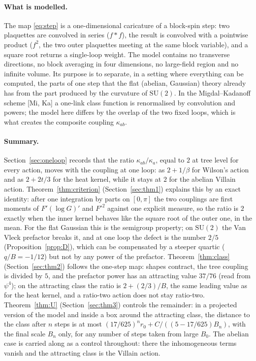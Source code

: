 \documentclass[11pt,a4paper]{article}
\theoremstyle{definition}
\theoremstyle{remark}
\newcommand{\SU}{\mathrm{SU}(2)}
\begin{document}
\paragraph{What is modelled.}
The map \eqref{eq:step} is a one-dimensional caricature of a block-spin step: two plaquettes are convolved in series ($f*f$), the result is convolved with a pointwise product ($f^2$, the two outer plaquettes meeting at the same block variable), and a square root returns a single-loop weight.
The model contains no transverse directions, no block averaging in four dimensions, no large-field region and no infinite volume.
Its purpose is to separate, in a setting where everything can be computed, the parts of one step that the flat (abelian, Gaussian) theory already has from the part produced by the curvature of $\SU$.
In the Migdal--Kadanoff scheme [Mi, Ka] a one-link class function is renormalised by convolution and powers; the model here differs by the overlap of the two fixed loops, which is what creates the composite coupling $\kappa_{ab}$.

\paragraph{Summary.}
Section~\ref{sec:oneloop} records that the ratio $\kappa_{ab}/\kappa_a$, equal to $2$ at tree level for every action, moves with the coupling at one loop: as $2+1/\beta$ for Wilson's action and as $2+2t/3$ for the heat kernel, while it stays at $2$ for the abelian Villain action.
Theorem~\ref{thm:criterion} (Section~\ref{sec:thm1}) explains this by an exact identity: after one integration by parts on $[0,\pi]$ the two couplings are first moments of $F'(\log G)'$ and $F'^2$ against one explicit measure, so the ratio is $2$ exactly when the inner kernel behaves like the square root of the outer one, in the mean.
For the flat Gaussian this is the semigroup property; on $\SU$ the Van Vleck prefactor breaks it, and at one loop the defect is the number $2/5$ (Proposition~\ref{prop:D}), which can be compensated by a steeper quartic ($q/B=-1/12$) but not by any power of the prefactor.
Theorem~\ref{thm:class} (Section~\ref{sec:thm2}) follows the one-step map: shapes contract, the tree coupling is divided by $5$, and the prefactor power has an attracting value $37/76$ (read from $\psi^4$); on the attracting class the ratio is $2+(2/3)/B$, the same leading value as for the heat kernel, and a ratio-two action does not stay ratio-two.
Theorem~\ref{thm:U} (Section~\ref{sec:thm3}) controls the remainder: in a projected version of the model and inside a box around the attracting class, the distance to the class after $n$ steps is at most $(17/625)^nr_0+C/((5-17/625)B_n)$, with the final scale $B_n$ only, for any number of steps taken from large $B_0$.
The abelian case is carried along as a control throughout: there the inhomogeneous terms vanish and the attracting class is the Villain action.
\end{document}

